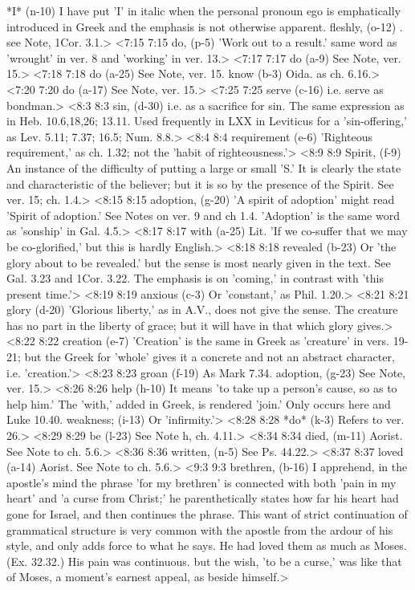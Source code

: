   *I* (n-10)  I have put 'I' in italic when the personal pronoun ego is  emphatically introduced in Greek and the emphasis is not  otherwise apparent.
  fleshly, (o-12)  \@Sarkinos. see Note, 1Cor. 3.1.>
<7:15 7:15  do, (p-5)  'Work out to a result.' same word as 'wrought' in ver. 8 and  'working' in ver. 13.>
<7:17 7:17  do (a-9) See Note, ver. 15.>
<7:18 7:18  do (a-25) See Note, ver. 15.
  know (b-3)  Oida. as ch. 6.16.>
<7:20 7:20  do (a-17)  See Note, ver. 15.>
<7:25 7:25  serve (c-16)  i.e. serve as bondman.>
<8:3 8:3  sin, (d-30)  i.e. as a sacrifice for sin. The same expression as in Heb.  10.6,18,26; 13.11. Used frequently in LXX in Leviticus for a  'sin-offering,' as Lev. 5.11; 7.37; 16.5; Num. 8.8.>
<8:4 8:4  requirement (e-6)  'Righteous requirement,' as ch. 1.32; not the 'habit of  righteousness.'>
<8:9 8:9  Spirit, (f-9)  An instance of the difficulty of putting a large or small  'S.' It is clearly the state and characteristic of the  believer; but it is so by the presence of the Spirit. See ver.  15; ch. 1.4.>
<8:15 8:15  adoption, (g-20)  'A spirit of adoption' might read 'Spirit of adoption.' See  Notes on ver. 9 and ch 1.4. 'Adoption' is the same word as  'sonship' in Gal. 4.5.>
<8:17 8:17  with (a-25)  Lit. 'If we co-suffer that we may be co-glorified,' but this  is hardly English.>
<8:18 8:18  revealed (b-23)  Or 'the glory about to be revealed.' but the sense is most  nearly given in the text. See Gal. 3.23 and 1Cor. 3.22. The  emphasis is on 'coming,' in contrast with 'this present time.'>
<8:19 8:19  anxious (c-3)  Or 'constant,' as Phil. 1.20.>
<8:21 8:21  glory (d-20)  'Glorious liberty,' as in A.V., does not give the sense. The  creature has no part in the liberty of grace; but it will have  in that which glory gives.>
<8:22 8:22  creation (e-7)  'Creation' is the same in Greek as 'creature' in vers. 19-21;  but the Greek for 'whole' gives it a concrete and not an  abstract character, i.e. 'creation.'>
<8:23 8:23  groan (f-19)  As Mark 7.34.
  adoption, (g-23)  See Note, ver. 15.>
<8:26 8:26  help (h-10)  It means 'to take up a person's cause, so as to help him.'  The 'with,' added in Greek, is rendered 'join.' Only occurs  here and Luke 10.40.
  weakness; (i-13)  Or 'infirmity.'>
<8:28 8:28  *do* (k-3)  Refers to ver. 26.>
<8:29 8:29  be (l-23)  See Note h, ch. 4.11.>
<8:34 8:34  died, (m-11)  Aorist. See Note to ch. 5.6.>
<8:36 8:36  written, (n-5)  See Ps. 44.22.>
<8:37 8:37  loved (a-14)  Aorist. See Note to ch. 5.6.>
<9:3 9:3  brethren, (b-16)  I apprehend, in the apostle's mind the phrase 'for my  brethren' is connected with both 'pain in my heart' and 'a  curse from Christ;' he parenthetically states how far his heart  had gone for Israel, and then continues the phrase. This want  of strict continuation of grammatical structure is very common  with the apostle from the ardour of his style, and only adds  force to what he says. He had loved them as much as Moses. (Ex. 32.32.)  His pain was continuous. but the wish, 'to be a curse,'  was like that of Moses, a moment's earnest appeal, as beside  himself.>
